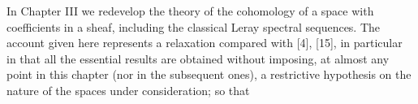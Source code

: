 In Chapter III we redevelop the theory of the cohomology of a space with
coefficients in a sheaf, including the classical Leray spectral sequences. The
account given here represents a relaxation compared with [4], [15], in
particular in that all the essential results are obtained without imposing, at
almost any point in this chapter (nor in the subsequent ones), a restrictive
hypothesis on the nature of the spaces under consideration; so that


